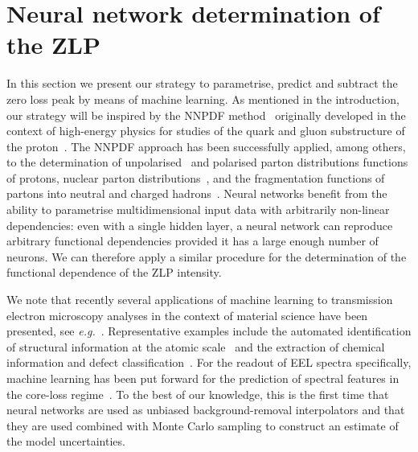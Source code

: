 \section{Neural network determination of the ZLP}
\label{sec:methodology}

In this section we present our strategy to parametrise, predict and subtract 
the zero loss peak by means of machine learning.
%
As mentioned in the introduction, our strategy will be inspired by the 
NNPDF method~\cite{Rojo:2018qdd} originally developed in the context of high-energy physics
for studies of the quark and gluon substructure of the proton~\cite{Gao:2017yyd}.
%
The NNPDF approach has been successfully applied, among others, to
the determination of
unpolarised~\cite{DelDebbio:2007ee,Ball:2008by,Ball:2012cx,Ball:2014uwa,Ball:2017nwa}
and polarised parton distributions functions of protons, nuclear
parton distributions~\cite{AbdulKhalek:2019mzd,AbdulKhalek:2020yuc}, and the
fragmentation functions of partons into neutral and charged
hadrons~\cite{Bertone:2017tyb,Bertone:2018ecm}.
%
Neural networks benefit from the ability to parametrise 
multidimensional input data with arbitrarily non-linear dependencies:
even with a single hidden layer, a neural network can reproduce arbitrary 
functional dependencies provided it has a large enough number of neurons.
%
We can therefore apply a similar procedure for the determination of the
functional dependence of the ZLP intensity. 

We note that recently several applications of machine learning
to transmission electron microscopy analyses 
in the context of material science have been
presented, see {\it e.g.}~\cite{Gordon:2020, Zhang:2019, Jany:2017, Ziatdinov:2017,10.1145/2834892.2834896,doi:10.1021/acsnano.7b07504,cite-key}.
%
Representative examples
include the automated identification
of structural information at the atomic scale~\cite{10.1145/2834892.2834896} 
and the extraction of chemical information
and defect classification~\cite{doi:10.1021/acsnano.7b07504}.
%
For the readout of EEL spectra specifically, 
machine learning has been put forward for the prediction
of spectral features in the core-loss regime~\cite{Kiyohara:2018}.
%
To the best of our knowledge, this is the first time that neural networks are used as 
unbiased background-removal interpolators and that they are used combined with 
Monte Carlo sampling to construct an estimate of the model uncertainties.\\

